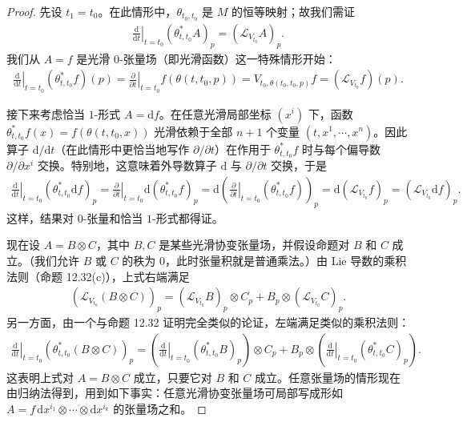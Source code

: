 \documentclass[../../main.tex]{subfiles}
\begin{document}
\begin{proof}
先设 $t_1=t_0$。在此情形中，$\theta_{t_0,t_0}$ 是 $M$ 的恒等映射；故我们需证
\begin{align}
\left.\frac{\mathrm{d}}{\mathrm{d}t}\right|_{t=t_0}(\theta_{t,t_0}^*A)_p
=(\mathcal L_{V_{t_0}}A)_p.
\end{align}
我们从 $A=f$ 是光滑 $0$-张量场（即光滑函数）这一特殊情形开始：
\begin{align*}
\left.\frac{\mathrm{d}}{\mathrm{d}t}\right|_{t=t_0}(\theta_{t,t_0}^*f)(p)
=\left.\frac{\partial}{\partial t}\right|_{t=t_0} f(\theta(t,t_0,p))
=V_{t_0,\theta(t_0,t_0,p)}f=(\mathcal L_{V_{t_0}}f)(p).
\end{align*}

接下来考虑恰当 $1$-形式 $A=\mathrm{d}f$。在任意光滑局部坐标 $(x^i)$ 下，函数 $\theta_{t,t_0}^*f(x)=f(\theta(t,t_0,x))$ 光滑依赖于全部 $n+1$ 个变量 $(t,x^1,\cdots ,x^n)$。因此算子 $\mathrm{d}/\mathrm{d}t$（在此情形中更恰当地写作 $\partial/\partial t$）在作用于 $\theta_{t,t_0}^*f$ 时与每个偏导数 $\partial/\partial x^i$ 交换。特别地，这意味着外导数算子 $\mathrm{d}$ 与 $\partial/\partial t$ 交换，于是
\begin{align*}
\left.\frac{\mathrm{d}}{\mathrm{d}t}\right|_{t=t_0}(\theta_{t,t_0}^*\mathrm{d}f)_p
=\left.\frac{\partial}{\partial t}\right|_{t=t_0}\mathrm{d}(\theta_{t,t_0}^*f)_p
=\mathrm{d}\left(\left.\frac{\partial}{\partial t}\right|_{t=t_0}(\theta_{t,t_0}^*f)\right)_p
=\mathrm{d}(\mathcal L_{V_{t_0}}f)_p
=(\mathcal L_{V_{t_0}}\mathrm{d}f)_p.
\end{align*}
这样，结果对 $0$-张量和恰当 $1$-形式都得证。

现在设 $A=B\otimes C$，其中 $B,C$ 是某些光滑协变张量场，并假设命题对 $B$ 和 $C$ 成立。（我们允许 $B$ 或 $C$ 的秩为 $0$，此时张量积就是普通乘法。）由 Lie 导数的乘积法则（命题 12.32(c)），上式右端满足
\begin{align*}
(\mathcal L_{V_{t_0}}(B\otimes C))_p
=(\mathcal L_{V_{t_0}}B)_p\otimes C_p+B_p\otimes(\mathcal L_{V_{t_0}}C)_p.
\end{align*}
另一方面，由一个与命题 12.32 证明完全类似的论证，左端满足类似的乘积法则：
\begin{align*}
\left.\frac{\mathrm{d}}{\mathrm{d}t}\right|_{t=t_0}(\theta_{t,t_0}^*(B\otimes C))_p
=\left(\left.\frac{\mathrm{d}}{\mathrm{d}t}\right|_{t=t_0}(\theta_{t,t_0}^*B)_p\right)\otimes C_p
+B_p\otimes\left(\left.\frac{\mathrm{d}}{\mathrm{d}t}\right|_{t=t_0}(\theta_{t,t_0}^*C)_p\right).
\end{align*}
这表明上式对 $A=B\otimes C$ 成立，只要它对 $B$ 和 $C$ 成立。任意张量场的情形现在由归纳法得到，用到如下事实：任意光滑协变张量场可局部写成形如 $A=f\,\mathrm{d}x^{i_1}\otimes\cdots\otimes\mathrm{d}x^{i_k}$ 的张量场之和。


\end{proof}
\end{document}
